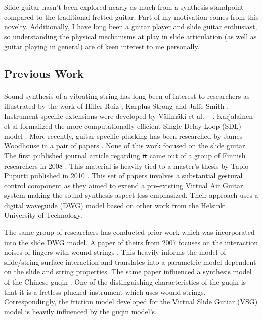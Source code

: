 \documentclass[12pt]{article}
\providecommand{\DIFadd}[1]{{\protect\color{blue}\uwave{#1}}} %
\providecommand{\DIFdel}[1]{{\protect\color{red}\sout{#1}}}                      %
\providecommand{\DIFaddbegin}{} %
\providecommand{\DIFaddend}{} %
\providecommand{\DIFdelbegin}{} %
\providecommand{\DIFdelend}{} %
\begin{document}
\DIFdelbegin \DIFdel{Slide-guitar }\DIFdelend \DIFaddbegin \DIFadd{The slide-guitar }\DIFaddend hasn’t been explored nearly as much from a synthesis standpoint compared to the traditional fretted guitar. Part of my motivation comes from this novelty. Additionally, I have long been a guitar player and slide guitar enthusiast, so understanding the physical mechanisms at play in slide articulation (as well as guitar playing in general) are of keen interest to me personally.

\subsection*{Previous Work}
\paragraph{}
Sound synthesis of a vibrating string has long been of interest to researchers as illustrated by the work of Hiller-Ruiz \cite{hiller_synthesizing_1971} \cite{hiller_synthesizing_1971-1}, Karplus-Strong \cite{karplus_digital_1983} and Jaffe-Smith \cite{jaffe_extensions_1983}. Instrument specific extensions were developed by Välimäki et al. \DIFdelbegin \DIFdel{\mbox{%
\cite{vaelimaeki_physical_1996-1}}\hskip0pt%
}\DIFdelend \DIFaddbegin \DIFadd{\mbox{%
\cite{vaelimaeki_physical_1996}}\hskip0pt%
}\DIFaddend .  Karjalainen et al formalized the more computationally efficient Single Delay Loop (SDL) model \cite{karjalainen_plucked-string_1998}. More recently, guitar specific plucking has been researched by James Woodhouse in a pair of papers \cite{woodhouse_synthesis_2004} \cite{woodhouse_plucked_2004}. None of this work focused on the slide guitar. The first published journal article regarding \DIFdelbegin \DIFdel{it }\DIFdelend \DIFaddbegin \DIFadd{this topic }\DIFaddend came out of a group of Finnish researchers in 2008 \cite{pakarinen_virtual_2008}. This material is heavily tied to a master’s thesis by Tapio Puputti published in 2010 \cite{puputti_real-time_2012}. This set of papers involves a substantial gestural control component as they aimed to extend a pre-existing Virtual Air Guitar system making the sound synthesis aspect less emphasized. Their approach uses a digital waveguide (DWG) model based on other work from the Helsinki University of Technology.

The same group of researchers has conducted prior work which was incorporated into the slide DWG model. A paper of theirs from 2007 focuses on the interaction noises of fingers with wound strings \cite{pakarinen_analysis_2007}. This heavily informs the model of slide/string surface interaction and translates into a parametric model dependent on the slide and string properties. The same paper influenced a synthesis model of the Chinese guqin \cite{penttinen_model-based_2006}. One of the distinguishing characteristics of the guqin is that it is a fretless plucked instrument which uses wound strings. Correspondingly, the friction model developed for the Virtual Slide Gutiar (VSG) model is heavily influenced by the guqin model's.
\end{document}
